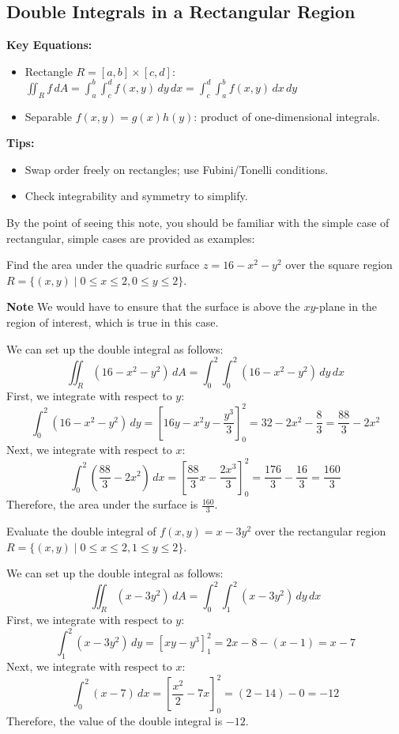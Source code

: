 \documentclass[11pt]{report}
\begin{document}
\subsection{Double Integrals in a Rectangular Region}

\begin{keybox}
	\textbf{Key Equations:}
\begin{itemize}
    \item Rectangle $R=[a,b]\times[c,d]$: $\displaystyle \iint_R f\,dA = \int_a^b\!\int_c^d f(x,y)\,dy\,dx = \int_c^d\!\int_a^b f(x,y)\,dx\,dy$
    \item Separable $f(x,y)=g(x)h(y)$: product of one-dimensional integrals.
\end{itemize}
	\textbf{Tips:}
\begin{itemize}
    \item Swap order freely on rectangles; use Fubini/Tonelli conditions.
    \item Check integrability and symmetry to simplify.
\end{itemize}
\end{keybox}

 By the point of seeing this note, you should be familiar with the simple case of rectangular, simple cases are provided as examples:

\begin{example}
    Find the area under the quadric surface $z = 16 - x^2 - y^2$ over the square region $R = \{ (x,y) \mid 0 \le x \le 2, 0 \le y \le 2\}$.

    \textbf{Note} We would have to ensure that the surface is above the $xy$-plane in the region of interest, which is true in this case.

    We can set up the double integral as follows:
    $$
        \iint_R (16 - x^2 - y^2) \, dA = \int_0^2 \int_0^2 (16 - x^2
        - y^2) \, dy \, dx
    $$
    First, we integrate with respect to $y$:
    $$
        \int_0^2 (16 - x^2 - y^2) \, dy = \left[ 16y - x^2y - \frac{y^3}{3} \right]_0^2 = 32 - 2x^2 - \frac{8}{3} = \frac{88}{3} - 2x^2
    $$
    Next, we integrate with respect to $x$:
    $$
        \int_0^2 \left( \frac{88}{3} - 2x^2 \right) \, dx = \left[ \frac{88}{3}x - \frac{2x^3}{3} \right]_0^2 = \frac{176}{3} - \frac{16}{3} = \frac{160}{3}
    $$
    Therefore, the area under the surface is $\frac{160}{3}$.

\end{example}

\begin{example}
    Evaluate the double integral of $f(x,y) = x - 3y^2$ over the rectangular region $R = \{ (x,y) \mid 0 \le x \le 2, 1 \le y \le 2\}$.

    We can set up the double integral as follows:
    $$
        \iint_R (x - 3y^2) \, dA = \int_0^2 \int_1^2 (x - 3y^2) \, dy \, dx
    $$
    First, we integrate with respect to $y$:
    $$
        \int_1^2 (x - 3y^2) \, dy = \left[ xy - y^3 \right]_1^2 = 2x - 8 - (x - 1) = x - 7
    $$
    Next, we integrate with respect to $x$:
    $$
        \int_0^2 (x - 7) \, dx = \left[ \frac{x^2}{2} - 7x \right]_0^2 = \left( 2 - 14 \right) - 0 = -12
    $$
    Therefore, the value of the double integral is $-12$.
\end{example}
\end{document}
